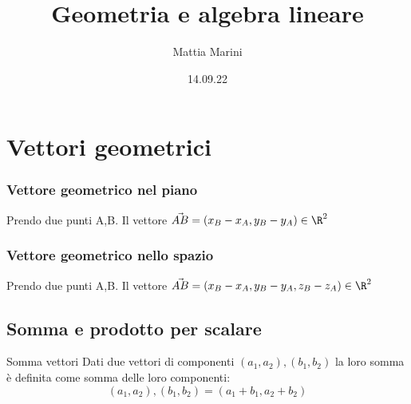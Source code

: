 
\endofdump

\usepackage{nicematrix}

\usetikzlibrary{external}
\tikzexternalize[prefix=tikz/]

\title{Geometria e algebra lineare}
\author{Mattia Marini}
\date{14.09.22}

\graphicspath{{Images}}



\maketitle
\tableofcontents
\listofdefs
\listoftheorems
\listofincomprensioni


\section{Vettori geometrici}
\subsubsection*{Vettore geometrico nel piano}\phantom{a}

Prendo due punti A,B. Il vettore $\vec{AB} = \left( x_B - x_A, y_B - y_A \right)  \in \R^2$

\subsubsection*{Vettore geometrico nello spazio}\phantom{a}

Prendo due punti A,B. Il vettore $\vec{AB} = \left( x_B - x_A, y_B - y_A, z_B - z_A \right)  \in \R^2$

\begin{center}
\end{center}

\subsection{Somma e prodotto per scalare}

\begin{definizione}{Somma vettori}
	Dati due vettori di componenti $\left( a_1, a_2 \right), \left( b_1,b_2 \right) $ la loro somma è definita come somma delle loro componenti:
	\[
		\left( a_1, a_2 \right), \left( b_1,b_2 \right) = \left( a_1+b_1, a_2+b_2 \right)
	\]
\end{definizione}

